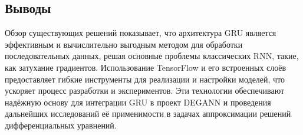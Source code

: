 \subsection{Выводы}

Обзор существующих решений показывает, что архитектура GRU является эффективным и вычислительно выгодным методом для обработки последовательных данных, решая основные проблемы классических RNN, такие, как затухание градиентов. Использование TensorFlow и его встроенных слоёв предоставляет гибкие инструменты для реализации и настройки моделей, что ускоряет процесс разработки и экспериментов. Эти технологии обеспечивают надёжную основу для интеграции GRU в проект DEGANN и проведения дальнейших исследований её применимости в задачах аппроксимации решений дифференциальных уравнений.
